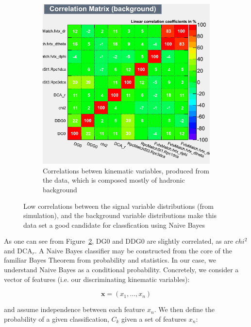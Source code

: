 \begin{figure}[H]
\begin{subfigure}[t]{0.5\textwidth}
		\includegraphics[width=0.95\linewidth]{./figures/CorrelationMatrix_Background.png}
		\caption{Correlations betwen kinematic variables, produced from the data,
			which is composed mostly of hadronic background}
		\label{fig:corr_mat_bkg}
	\end{subfigure}
	\caption{ Low correlations between the signal variable distributions (from
		simulation), and the background variable distributions make this data set a
		good candidate for classfication using Naive Bayes}
	\label{fig:kinematic_var_correlations}
\end{figure}

As one can see from Figure~\ref{fig:kinematic_var_correlations}, DG0 and DDG0
are slightly correlated, as are $chi^2$ and DCA$_r$. A Naive Bayes classifier
may be constructed from the core of the familiar Bayes Theorem from probability
and statistics. In our case, we understand Naive Bayes as a conditional
probability. Concretely, we consider a vector of features (i.e.  our
discriminating kinematic variables):

\begin{equation}
	\label{eq:feature_vector}
\mathbf{x} = (x_1, \dots, x_n)
\end{equation}

and assume independence between each feature $x_n$. We then define the
probability of a given classification, $C_k$ given a set of features $x_n$:

